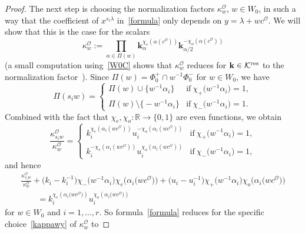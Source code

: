 \begin{proof}
The next step is choosing the normalization factors $\kappa_w^\mathcal{O}$, $w\in W_0$, in such a way that the coefficient of $x^{s_i\lambda}$ in~\eqref{formula}
only depends on $y=\lambda+wc^\mathcal{O}$. We will show that this is the case for the scalars
\begin{equation}\label{kappawy}
\kappa_w^\mathcal{O}:=\prod_{\alpha\in\Pi(w)}\mathbf{k}_\alpha^{\chi_e(\alpha(c^\mathcal{O}))}\mathbf{k}_{\alpha/2}^{-\chi_o(\alpha(c^\mathcal{O}))}
\end{equation}
(a small computation using~\eqref{W0C} shows that $\kappa_w^\mathcal{O}$ reduces for $\mathbf{k}\in\mathcal{K}^{{\rm res}}$ to the normalization factor~\cite[(4.11)]{SSV2}).
Since $\Pi(w)=\Phi_0^+\cap w^{-1}\Phi_0^-$ for $w\in W_0$, we have
\begin{equation*}
\Pi(s_iw)=
\begin{cases}
\Pi(w)\cup\big\{w^{-1}\alpha_i\big\} &\text{if}\ \chi_+\bigl(w^{-1}\alpha_i\bigr)=1,\\
\Pi(w)\setminus\big\{-w^{-1}\alpha_i\big\} &\text{if} \
\chi_-\bigl(w^{-1}\alpha_i\bigr)=1.
\end{cases}
\end{equation*}
Combined with the fact that $\chi_e,\chi_o\colon \mathbb{R}\rightarrow\{0,1\}$ are even functions, we obtain
\begin{equation*}
\frac{\kappa_{s_iw}^\mathcal{O}}{\kappa_w^\mathcal{O}}=
\begin{cases}
k_i^{\chi_e(\alpha_i (wc^\mathcal{O}))}u_i^{-\chi_o(\alpha_i (wc^\mathcal{O} ))} &\text{if}\ \chi_+\bigl(w^{-1}\alpha_i\bigr)=1,\\
k_i^{-\chi_e(\alpha_i (wc^\mathcal{O}))}u_i^{\chi_o(\alpha_i (wc^\mathcal{O} ))} &\text{if}\ \chi_-\bigl(w^{-1}\alpha_i\bigr)=1,
\end{cases}
\end{equation*}
and hence
\begin{gather*}%
\frac{\kappa_{s_iw}^\mathcal{O}}{\kappa_w^\mathcal{O}}
+\bigl(k_i-k_i^{-1}\bigr)\chi_-\bigl(w^{-1}\alpha_i\bigr)\chi_e\bigl(\alpha_i\bigl(wc^\mathcal{O}\bigr)\bigr)+\bigl(u_i-u_i^{-1}\bigr)\chi_+\bigl(w^{-1}\alpha_i\bigr)\chi_o\bigl(\alpha_i\bigl(wc^\mathcal{O}\bigr)\bigr)\\
\qquad =k_i^{\chi_e(\alpha_i\bigl(wc^\mathcal{O}\bigr))}u_i^{\chi_o(\alpha_i\bigl(wc^\mathcal{O}\bigr))}
\end{gather*}
for $w\in W_0$ and $i=1,\dots,r$. So formula~\eqref{formula} reduces
for the specific choice~\eqref{kappawy} of $\kappa_w^\mathcal{O}$ to

\end{proof}
